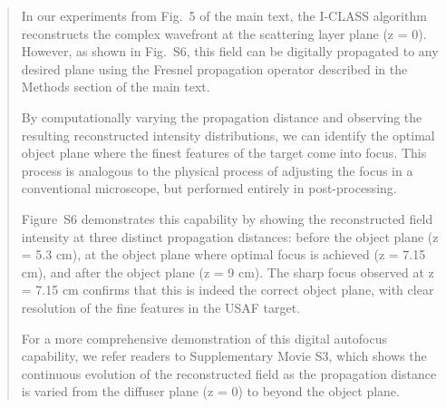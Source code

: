\documentclass[12pt]{article}
\newenvironment{ourresponse}
    {\begin{tcolorbox}[width=\linewidth,breakable,enhanced,colback=gray!5,colframe=responsecolor!50,title=Response,left=5pt,right=5pt]}
    {\end{tcolorbox}}
\begin{document}
\begin{enumerate}[label=\arabic*.]
\begin{enumerate}[label=3.\alph*.]
\begin{ourresponse}
\begin{quote}
                In our experiments from Fig.~5 of the main text, the I-CLASS algorithm reconstructs the complex wavefront at the scattering layer plane (z = 0). However, as shown in Fig.~S6, this field can be digitally propagated to any desired plane using the Fresnel propagation operator described in the Methods section of the main text. 
                
                By computationally varying the propagation distance and observing the resulting reconstructed intensity distributions, we can identify the optimal object plane where the finest features of the target come into focus. This process is analogous to the physical process of adjusting the focus in a conventional microscope, but performed entirely in post-processing.
                
                Figure~S6 demonstrates this capability by showing the reconstructed field intensity at three distinct propagation distances: before the object plane (z = 5.3 cm), at the object plane where optimal focus is achieved (z = 7.15 cm), and after the object plane (z = 9 cm). The sharp focus observed at z = 7.15 cm confirms that this is indeed the correct object plane, with clear resolution of the fine features in the USAF target.
                
                For a more comprehensive demonstration of this digital autofocus capability, we refer readers to Supplementary Movie S3, which shows the continuous evolution of the reconstructed field as the propagation distance is varied from the diffuser plane (z = 0) to beyond the object plane.
        

\end{quote}
\end{ourresponse}
\end{enumerate}
\end{enumerate}
\end{document}
